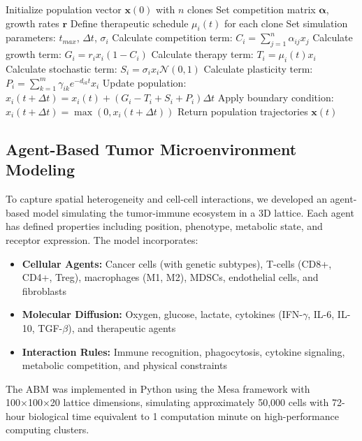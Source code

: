 \documentclass[12pt,a4paper]{article}
\begin{document}
\begin{algorithm}
\caption{Tumor Evolution Simulation with Therapeutic Intervention}
\begin{algorithmic}[1]
\State Initialize population vector $\mathbf{x}(0)$ with $n$ clones
\State Set competition matrix $\mathbf{\alpha}$, growth rates $\mathbf{r}$
\State Define therapeutic schedule $\mu_i(t)$ for each clone
\State Set simulation parameters: $t_{max}$, $\Delta t$, $\sigma_i$
    \State Calculate competition term: $C_i = \sum_{j=1}^{n} \alpha_{ij} x_j$
    \State Calculate growth term: $G_i = r_i x_i (1 - C_i)$
    \State Calculate therapy term: $T_i = \mu_i(t) x_i$
    \State Calculate stochastic term: $S_i = \sigma_i x_i \mathcal{N}(0,1)$
    \State Calculate plasticity term: $P_i = \sum_{k=1}^{m} \gamma_{ik} e^{-d_{ik}t} x_i$
    \State Update population: $x_i(t+\Delta t) = x_i(t) + (G_i - T_i + S_i + P_i)\Delta t$
    \State Apply boundary condition: $x_i(t+\Delta t) = \max(0, x_i(t+\Delta t))$
\EndFor
\State Return population trajectories $\mathbf{x}(t)$
\end{algorithmic}
\end{algorithm}

\subsection{Agent-Based Tumor Microenvironment Modeling}

To capture spatial heterogeneity and cell-cell interactions, we developed an agent-based model simulating the tumor-immune ecosystem in a 3D lattice. Each agent has defined properties including position, phenotype, metabolic state, and receptor expression. The model incorporates:

\begin{itemize}
    \item \textbf{Cellular Agents:} Cancer cells (with genetic subtypes), T-cells (CD8+, CD4+, Treg), macrophages (M1, M2), MDSCs, endothelial cells, and fibroblasts
    \item \textbf{Molecular Diffusion:} Oxygen, glucose, lactate, cytokines (IFN-$\gamma$, IL-6, IL-10, TGF-$\beta$), and therapeutic agents
    \item \textbf{Interaction Rules:} Immune recognition, phagocytosis, cytokine signaling, metabolic competition, and physical constraints
\end{itemize}

The ABM was implemented in Python using the Mesa framework with 100×100×20 lattice dimensions, simulating approximately 50,000 cells with 72-hour biological time equivalent to 1 computation minute on high-performance computing clusters.
\end{document}
